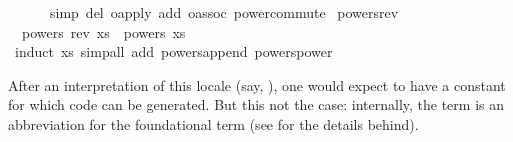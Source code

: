 \begin{isabellebody}
\ \ \ \ \ \ simp\ del{\isacharcolon}\ o{\isacharunderscore}apply\ add{\isacharcolon}\ o{\isacharunderscore}assoc\ power{\isacharunderscore}commute{\isacharparenright}\isanewline
\isanewline
{}\isamarkupfalse%
\ powers{\isacharunderscore}rev{\isacharcolon}\isanewline
\ \ {\isachardoublequoteopen}powers\ {\isacharparenleft}rev\ xs{\isacharparenright}\ {\isacharequal}\ powers\ xs{\isachardoublequoteclose}\isanewline
\ \ \ \ \isamarkupfalse%
\ {\isacharparenleft}induct\ xs{\isacharparenright}\ {\isacharparenleft}simp{\isacharunderscore}all\ add{\isacharcolon}\ powers{\isacharunderscore}append\ powers{\isacharunderscore}power{\isacharparenright}\isanewline
\isanewline
{}\isamarkupfalse%
%
\endisatagquote
{\isafoldquote}%
%
\isadelimquote
%
\endisadelimquote
%
\begin{isamarkuptext}%
After an interpretation of this locale (say, \hypertarget{command.interpretation}{\hyperlink{command.interpretation}{\mbox{}}}  ), one would expect to have a constant  for which code
  can be generated.  But this not the case: internally, the term
   is an abbreviation for the foundational
  term 
  (see \cite{isabelle-locale} for the details behind).


\end{isamarkuptext}
\end{isabellebody}
